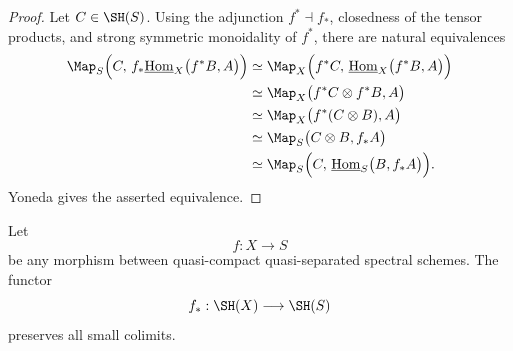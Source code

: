 \begin{proof}
Let \(C\in\SH(S)\).  Using the adjunction \(f^*\dashv f_*\), closedness of
the tensor products, and strong symmetric monoidality of \(f^*\), there are
natural equivalences
\[
\begin{aligned}
    \Map_S
    \Bigl(
      C,\,
      f_*
      \underline{\operatorname{Hom}}_X
      \bigl(
        f^*B,
        A
      \bigr)
    \Bigr)
    &\simeq
    \Map_X
    \Bigl(
      f^*C,\,
      \underline{\operatorname{Hom}}_X
      \bigl(
        f^*B,
        A
      \bigr)
    \Bigr) \\
    &\simeq
    \Map_X
    \bigl(
      f^*C\otimes f^*B,
      A
    \bigr) \\
    &\simeq
    \Map_X
    \bigl(
      f^*(C\otimes B),
      A
    \bigr) \\
    &\simeq
    \Map_S
    \bigl(
      C\otimes B,
      f_*A
    \bigr) \\
    &\simeq
    \Map_S
    \Bigl(
      C,\,
      \underline{\operatorname{Hom}}_S
      \bigl(
        B,
        f_*A
      \bigr)
    \Bigr).
\end{aligned}
\]
Yoneda gives the asserted equivalence.
\end{proof}

\begin{theorem}
\label{thm:arbitrary-direct-image-cocontinuous}
Let
\[
    f:X\longrightarrow S
\]
be any morphism between quasi-compact quasi-separated spectral schemes.  The
functor
\[
    f_*:\SH(X)\longrightarrow\SH(S)
\]
preserves all small colimits.
\end{theorem}

